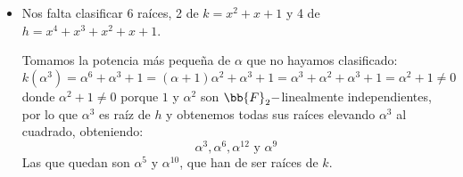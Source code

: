 \begin{ejemplo}
\begin{itemize}
            Buscamos heurísticamente generadores de $\bb{F}_{16}^\times$ (ya que hemos obtenido $\bb{F}_{16}$ por $\alpha$, que era raíz de $f$), por lo que creemos que $\alpha^7$ (la primera potencia de $\alpha$ que genera todo el grupo cíclico) es un candidato a raíz de $g$. Lo comprobamos (pensando que $\alpha^{15} = 1$):
            \begin{align*}
                g(\alpha^7) &= {(\alpha^7)}^{4} + {(\alpha^7)}^{3} + 1 = \alpha^{28} + \alpha^{21} + 1 = \alpha^{13} + \alpha^{6} + 1 = {(\alpha^4)}^{3}\alpha + \alpha^4 \alpha^2 + 1 \\
                            &= {(\alpha+1)}^{3}\alpha + (\alpha+1)\alpha^2 + 1 = (\alpha^3 + \alpha^2 + \alpha + 1)\alpha + \alpha^3 + \alpha^2 + 1 \\
                            &= \alpha + 1 + \alpha^3 + \alpha^2 + \alpha + \alpha^3 + \alpha^2 + 1 = 0
            \end{align*}
            En efecto, $\alpha^7$ es una raíz de $g$. Ahora:
            \begin{itemize}
                \item Elevamos $\alpha^7$ al cuadrado varias veces.
                \item Vemos elevar al cuadrado como automorfismo de Frobenius, que restringido a $\bb{F}_{16}^\times$ es un automorfismo de grupos, por lo que lleva generadores en generadores, obteniendo que las raíces de $g$ son:
                    \begin{equation*}
                        \alpha^7, \alpha^{11}, \alpha^{13} \text{\ y\ } \alpha^{14}
                    \end{equation*}
            \end{itemize}
        \item Nos falta clasificar 6 raíces, 2 de $k=x^2+x+1$ y 4 de $h=x^4+x^3+x^2+x+1$.

            Tomamos la potencia más pequeña de $\alpha$ que no hayamos clasificado:
            \begin{equation*}
                k(\alpha^3) = \alpha^6 + \alpha^3 + 1 = (\alpha+1)\alpha^2 + \alpha^3 + 1 = \alpha^3 + \alpha^2 + \alpha^3 + 1 = \alpha^2 + 1 \neq 0
            \end{equation*}
            donde $\alpha^2 + 1 \neq 0$ porque $1$ y $\alpha^2$ son $\bb{F}_2-$linealmente independientes, por lo que $\alpha^3$ es raíz de $h$ y obtenemos todas sus raíces elevando $\alpha^3$ al cuadrado, obteniendo:
            \begin{equation*}
                \alpha^3, \alpha^6, \alpha^{12} \text{\ y\ } \alpha^9
            \end{equation*}
            Las que quedan son $\alpha^5$ y $\alpha^{10}$, que han de ser raíces de $k$.


\end{itemize}
\end{ejemplo}
